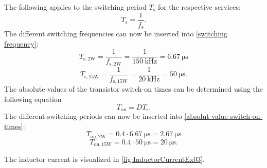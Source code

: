  \begin{solutionblock}
 The following applies to the switching period $T_\mathrm{s}$ for the respective services:  
 \begin{equation}
    T_\mathrm{s} = \frac{1}{f_\mathrm{s}}. \label{switching frequency}
 \end{equation}
 The different switching frequencies can now be inserted into \ref{switching frequency}:
 \begin{equation}
    T_\mathrm{s,2W} =\frac{1}{f_{\mathrm{s,2W}}} = \frac{1}{\SI{150}{\kilo \hertz}}= \SI{6.67}{\micro \s}
 \end{equation}
 \begin{equation}
    T_\mathrm{s,15W} =\frac{1}{f_{\mathrm{s,15W}}} = \frac{1}{\SI{20}{\kilo \hertz}}= \SI{50}{\micro \s}.
 \end{equation}
 The absolute values of the transistor switch-on times can be determined using the following equation
 \begin{equation}
    T_\mathrm{on} = D T_\mathrm{s}. \label{absolut value switch-on-times}
 \end{equation}
 The different switching periods can now be inserted into \ref{absolut value switch-on-times}:
 \begin{equation}
    T_\mathrm{on,2W} = 0.4 \cdot \SI{6.67}{\micro \s} = \SI{2.67}{\micro \s}
 \end{equation}
 \begin{equation}
    T_\mathrm{on,15W} = 0.4 \cdot \SI{50}{\micro \s}= \SI{20}{\micro \s}.
 \end{equation}
 \end{solutionblock}

\begin{solutionblock}
    The inductor current is visualized in \autoref{fig:InductorCurrentEx03}.
       
\end{solutionblock}
    
 
